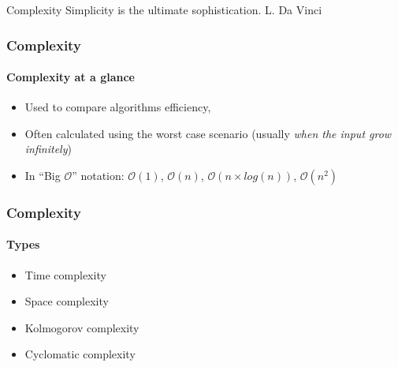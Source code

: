 \begin{sepframe}{Complexity}
    {\scriptsize{Simplicity is the ultimate sophistication. L. Da Vinci}}
\end{sepframe}

\begin{frame}
    \frametitle{Complexity}
    \framesubtitle{Complexity at a glance}

    \begin{itemize}[<+->]
        \item Used to compare algorithms efficiency,
        \item Often calculated using the worst case scenario (usually \textit{when the input grow infinitely})
        \item In ``Big $\mathcal{O}$'' notation: $\mathcal{O}(1)$, $\mathcal{O}(n)$, $\mathcal{O}(n \times log(n))$, $\mathcal{O}(n^2)$
    \end{itemize}


\end{frame}

\begin{frame}
    \frametitle{Complexity}
    \framesubtitle{Types}

    \begin{itemize}[<+->]
        \item Time complexity
        \item Space complexity
        \item Kolmogorov complexity
        \item Cyclomatic complexity
    \end{itemize}

\end{frame}

